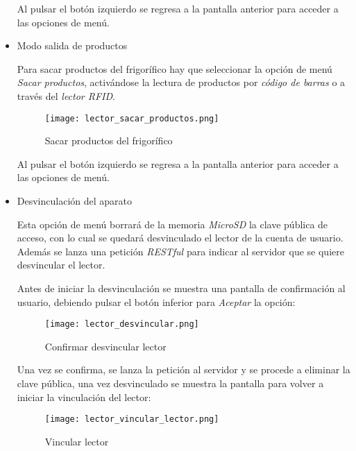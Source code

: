 \begin{itemize}
        Al pulsar el botón izquierdo se regresa a la pantalla anterior para acceder a las opciones de menú.

    \item Modo salida de productos

        Para sacar productos del frigorífico hay que seleccionar la opción de menú  \emph{Sacar productos}, activándose la lectura de productos por \emph{código de barras} o a través del \emph{lector RFID}.

        \begin{figure}[H]
            \centering
            \texttt{[image: lector\_sacar\_productos.png]}
            \caption{Sacar productos del frigorífico}\label{fig:lector_sacar_productos}
        \end{figure}

        Al pulsar el botón izquierdo se regresa a la pantalla anterior para acceder a las opciones de menú.

    \item Desvinculación del aparato

        Esta opción de menú borrará de la memoria \emph{MicroSD} la clave pública de acceso, con lo cual se quedará desvinculado el lector de la cuenta de usuario. Además se lanza una petición \emph{RESTful} para indicar al servidor que se quiere desvincular el lector.

        Antes de iniciar la desvinculación se muestra una pantalla de confirmación al usuario, debiendo pulsar el botón inferior para \emph{Aceptar} la opción:

        \begin{figure}[H]
            \centering
            \texttt{[image: lector\_desvincular.png]}
            \caption{Confirmar desvincular lector}\label{fig:lector_desvincular}
        \end{figure}

        Una vez se confirma, se lanza la petición al servidor y se procede a eliminar la clave pública, una vez desvinculado se muestra la pantalla para volver a iniciar la vinculación del lector:

        \begin{figure}[H]
            \centering
            \texttt{[image: lector\_vincular\_lector.png]}
            \caption{Vincular lector}\label{fig:lector_vincular_lector}
        \end{figure}

\end{itemize}